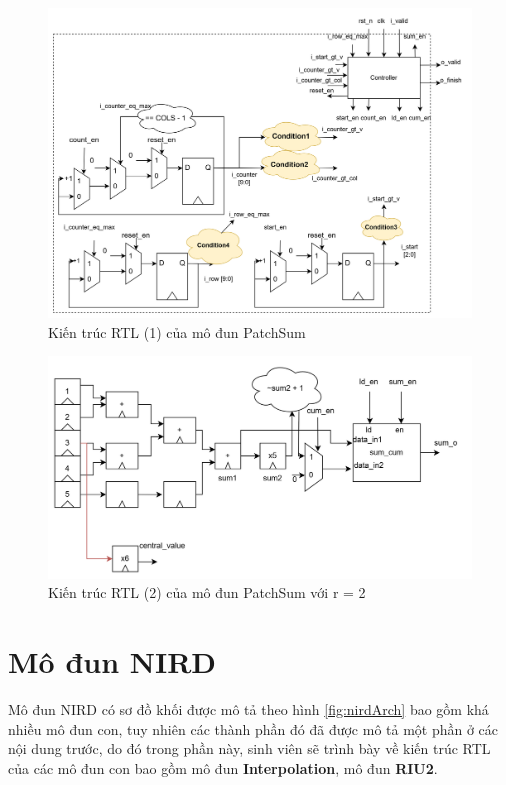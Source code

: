 \begin{figure}[!ht]
	\centering
	\includegraphics[width=\linewidth]{figures/patchSumRTL.png}
	\caption{Kiến trúc RTL (1) của mô đun PatchSum}
	\label{fig:patchSumRTL}
\end{figure}
\begin{figure}[!ht]
	\centering
	\includegraphics[width=1\linewidth]{figures/patchSumRTL_2.png}
	\caption{Kiến trúc RTL (2) của mô đun PatchSum với r = 2}
	\label{fig:patchSumRTL_2}
\end{figure}

\section{Mô đun NIRD}
Mô đun NIRD có sơ đồ khối được mô tả theo hình \ref{fig:nirdArch} bao gồm khá nhiều mô đun con, tuy nhiên các thành phần đó đã được mô tả một phần ở các nội dung trước, do đó trong phần này, sinh viên sẽ trình bày về kiến trúc RTL của các mô đun con bao gồm mô đun \textbf{Interpolation}, mô đun \textbf{RIU2}.
